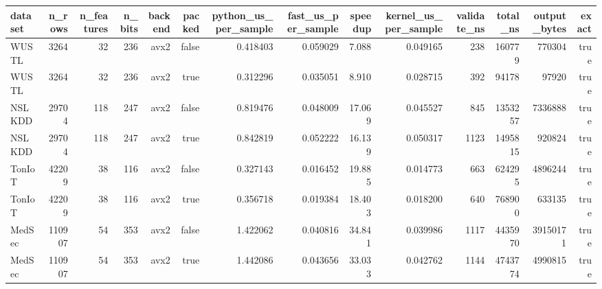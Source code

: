 \begin{tabular}{lrrrrrrrrrrrrr}
\toprule
dataset & n\_rows & n\_features & n\_bits & backend & packed & python\_us\_per\_sample & fast\_us\_per\_sample & speedup & kernel\_us\_per\_sample & validate\_ns & total\_ns & output\_bytes & exact \\
\midrule
WUSTL & 3264 & 32 & 236 & avx2 & false & 0.418403 & 0.059029 & 7.088 & 0.049165 & 238 & 160779 & 770304 & true \\
WUSTL & 3264 & 32 & 236 & avx2 & true & 0.312296 & 0.035051 & 8.910 & 0.028715 & 392 & 94178 & 97920 & true \\
NSLKDD & 29704 & 118 & 247 & avx2 & false & 0.819476 & 0.048009 & 17.069 & 0.045527 & 845 & 1353257 & 7336888 & true \\
NSLKDD & 29704 & 118 & 247 & avx2 & true & 0.842819 & 0.052222 & 16.139 & 0.050317 & 1123 & 1495815 & 920824 & true \\
TonIoT & 42209 & 38 & 116 & avx2 & false & 0.327143 & 0.016452 & 19.885 & 0.014773 & 663 & 624295 & 4896244 & true \\
TonIoT & 42209 & 38 & 116 & avx2 & true & 0.356718 & 0.019384 & 18.403 & 0.018200 & 640 & 768900 & 633135 & true \\
MedSec & 110907 & 54 & 353 & avx2 & false & 1.422062 & 0.040816 & 34.841 & 0.039986 & 1117 & 4435970 & 39150171 & true \\
MedSec & 110907 & 54 & 353 & avx2 & true & 1.442086 & 0.043656 & 33.033 & 0.042762 & 1144 & 4743774 & 4990815 & true \\
\bottomrule
\end{tabular}
